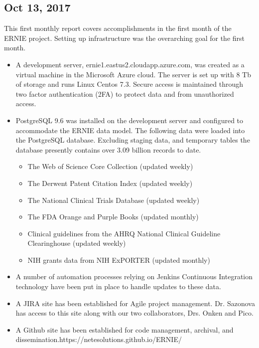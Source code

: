 \documentclass[11pt, oneside]{article}   	%
\begin{document}
\pagebreak
\subsection*{Oct 13, 2017}

This first monthly report covers accomplishments in the first month of the ERNIE project. Setting up infrastructure was the overarching goal for the first month.

\begin {itemize}
\item A development server, ernie1.eastus2.cloudapp.azure.com, was created as a virtual machine in the Microsoft Azure cloud. The server is set up with 8 Tb of storage and runs Linux Centos 7.3. Secure access is maintained through two factor authentication (2FA) to protect data and from unauthorized access.
\item PostgreSQL 9.6 was installed on the development server and configured to accommodate the ERNIE data model. The following data were loaded into the PostgreSQL database. Excluding staging data, and temporary tables the database presently contains over 3.09 billion records to date.

\begin {itemize}
\item The Web of Science Core Collection (updated weekly)
\item The Derwent Patent Citation Index  (updated weekly)
\item The National Clinical Trials Database  (updated weekly)
\item The FDA Orange and Purple Books  (updated monthly)
\item Clinical guidelines from the AHRQ National Clinical Guideline Clearinghouse (updated weekly)
\item NIH grants data from NIH ExPORTER (updated monthly)
\end {itemize}

\item A number of automation processes relying on Jenkins Continuous Integration technology have been put in place to handle updates to these data.
\item A JIRA site has been established for Agile project management. Dr. Sazonova has access to this site along with our two collaborators, Drs. Onken and Pico.
\item A Github site has been established for code management, archival, and dissemination.https://netesolutions.github.io/ERNIE/
\end {itemize}
\end{document}
